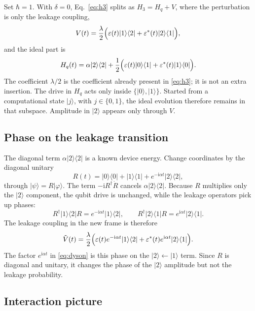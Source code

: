 \documentclass[11pt,a4paper]{article}
\theoremstyle{definition}
\newcommand{\ket}[1]{\lvert #1\rangle}
\newcommand{\bra}[1]{\langle #1\rvert}
\newcommand{\ii}{\mathrm{i}}
\newcommand{\eps}{\varepsilon}
\begin{document}
Set \(\hbar=1\).  With \(\delta=0\), Eq.~\eqref{eq:h3} splits as
\(H_3=H_q+V\), where the perturbation is only the leakage coupling,
\begin{equation*}
  V(t)=\frac{\lambda}{2}\Bigl(
    \eps(t)\ket1\bra2+\eps^*(t)\ket2\bra1\Bigr),
\end{equation*}
and the ideal part is
\begin{equation*}
  H_q(t)=\alpha\ket2\bra2
  +\frac12\Bigl(\eps(t)\ket0\bra1+\eps^*(t)\ket1\bra0\Bigr).
\end{equation*}
The coefficient \(\lambda/2\) is the coefficient already present in
\eqref{eq:h3}; it is not an extra insertion.  The drive in \(H_q\) acts only
inside \(\{\ket0,\ket1\}\).  Started from a computational state \(\ket j\),
with \(j\in\{0,1\}\), the ideal evolution therefore remains in that subspace.
Amplitude in \(\ket2\) appears only through \(V\).

\subsection{Phase on the leakage transition}

The diagonal term \(\alpha\ket2\bra2\) is a known device energy.  Change
coordinates by the diagonal unitary
\begin{equation*}
  R(t)=\ket0\bra0+\ket1\bra1+e^{-\ii\alpha t}\ket2\bra2,
\end{equation*}
through \(|\psi\rangle=R|\varphi\rangle\).  The term \(-\ii R^\dagger\dot R\)
cancels \(\alpha\ket2\bra2\).  Because \(R\) multiplies only the \(\ket2\)
component, the qubit drive is unchanged, while the leakage operators pick up
phases:
\begin{equation*}
  R^\dagger\ket1\bra2 R=e^{-\ii\alpha t}\ket1\bra2,
  \qquad
  R^\dagger\ket2\bra1 R=e^{\ii\alpha t}\ket2\bra1.
\end{equation*}
The leakage coupling in the new frame is therefore
\begin{equation*}
  \tilde V(t)=\frac{\lambda}{2}\Bigl(
    \eps(t)e^{-\ii\alpha t}\ket1\bra2
    +\eps^*(t)e^{\ii\alpha t}\ket2\bra1\Bigr).
\end{equation*}
The factor \(e^{\ii\alpha t}\) in \eqref{eq:dyson} is this phase on the
\(\ket2\leftarrow\ket1\) term.  Since \(R\) is diagonal and unitary, it changes
the phase of the \(\ket2\) amplitude but not the leakage probability.

\subsection{Interaction picture}
\end{document}
